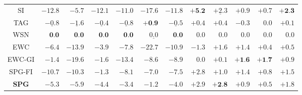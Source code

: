 \begin{table}[t]
{\begin{tabular}{crrrrrrrrrrr}
SI &
$-12.8$ & $-5.7$ &
$-12.1$ & $-11.0$ &
$-17.6$ &
$-11.8$ &
$\textbf{+5.2}$ & $\underline{+2.3}$ &
$+0.9$ & $+0.7$ & 
$\textbf{+2.3}$ \\


TAG &
$\underline{-0.8}$ & $\underline{-1.6}$ &
$\underline{-0.4}$ & $\underline{-0.8}$ &
$\textbf{+0.9}$ &
$\underline{-0.5}$ &
$+0.4$ & $+0.4$ &
$-0.3$ & $0.0$ & 
$+0.1$ \\


WSN & 
$\textbf{0.0}$ & $\textbf{0.0}$ &
$\textbf{0.0}$ & $\textbf{0.0}$ &
$\underline{0.0}$ & 
$\textbf{0.0}$ & 
$0.0$ & $0.0$ &
$0.0$ & $0.0$ &
$0.0$ \\


EWC & 
$-6.4$ & $-13.9$ & 
$-3.9$ & $-7.8$ & 
$-22.7$ &
$-10.9$ &
$-1.3$ & $+1.6$ &
$+1.4$ & $+0.4$ & 
$+0.5$ \\


\hdashline


EWC-GI &
$-1.4$ & $-19.6$ &
$-1.6$ & $-13.4$ &
$-8.6$ &
$-8.9$ &
$0.0$ & $+0.1$ &
$\textbf{+1.6}$ & $\textbf{+1.7}$ &
$+0.9$ \\


SPG-FI &
$-10.7$ & $-10.3$ &
$-1.3$ & $-8.1$ &
$-7.0$ & 
$-7.5$ &
$+2.8$ & $+1.0$ &
$+1.4$ & $+0.8$ &
$+1.5$ \\


\midrule


\textbf{SPG} &
$-5.3$ & $-5.9$ &
$-4.4$ & $-3.4$ &
$-1.2$ &
$-4.0$ &
$+2.9$ & $\textbf{+2.8}$ &
$+0.9$ & $+0.5$ &
$+1.8$ \\


\bottomrule
\end{tabular}
}
\vspace{-3mm}
\end{table}


